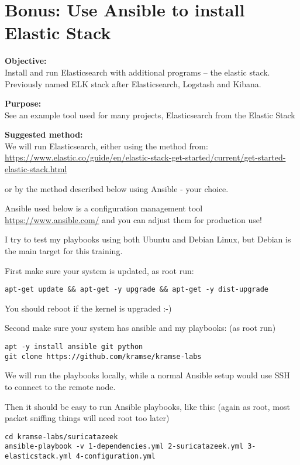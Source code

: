 \documentclass[a4paper,11pt,notitlepage]{report}
\begin{document}
\chapter{Bonus: Use Ansible to install Elastic Stack}
\label{ex:basicansible}


{\bf Objective:}\\
Install and run Elasticsearch with additional programs -- the elastic stack. Previously named ELK stack after Elasticsearch, Logstash and Kibana.

{\bf Purpose:}\\
See an example tool used for many projects, Elasticsearch from the Elastic Stack

{\bf Suggested method:}\\
We will run Elasticsearch, either using the method from:\\{\footnotesize
\url{https://www.elastic.co/guide/en/elastic-stack-get-started/current/get-started-elastic-stack.html}}

or by the method described below using Ansible - your choice.

Ansible used below is a configuration management tool \url{https://www.ansible.com/} and you can adjust them for production use!

I try to test my playbooks using both Ubuntu and Debian Linux, but Debian is the main target for this training.

First make sure your system is updated, as root run:

\begin{verbatim}
apt-get update && apt-get -y upgrade && apt-get -y dist-upgrade
\end{verbatim}

You should reboot if the kernel is upgraded :-)

Second make sure your system has ansible and my playbooks: (as root run)
\begin{verbatim}
apt -y install ansible git python
git clone https://github.com/kramse/kramse-labs
\end{verbatim}

We will run the playbooks locally, while a normal Ansible setup would use SSH to connect to the remote node.

Then it should be easy to run Ansible playbooks, like this: (again as root, most packet sniffing things will need root too later)

\begin{verbatim}
cd kramse-labs/suricatazeek
ansible-playbook -v 1-dependencies.yml 2-suricatazeek.yml 3-elasticstack.yml 4-configuration.yml
\end{verbatim}
\end{document}
